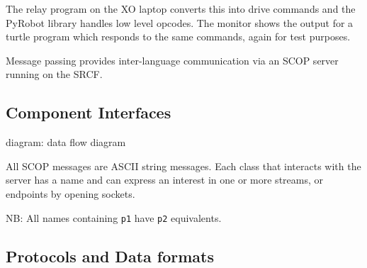 \documentclass[12pt,a4,notitlepage]{report}
\renewcommand{\_}{\texttt{\symbol{95}}}
\newcommand{\<}{\texttt{\symbol{60}}}
\renewcommand{\>}{\texttt{\symbol{62}}}
\begin{document}
The relay program on the XO laptop converts this into drive commands and the PyRobot library handles low level opcodes. The monitor shows the output for a turtle program which responds to the same commands, again for test purposes.

Message passing provides inter-language communication via an SCOP server running on the SRCF.

\subsection{Component Interfaces}

{diagram: data flow diagram}

All SCOP messages are ASCII string messages. Each class that interacts with the server has a name and can express an interest in one or more streams, or endpoints by opening sockets.

NB: All names containing \verb^p1^ have \verb^p2^ equivalents.

\subsection{Protocols and Data formats}
\end{document}
